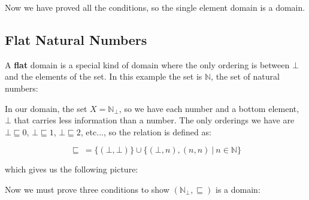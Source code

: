 \vspace{0.25cm}

Now we have proved all the conditions, so the single element domain is a domain.


\subsection{Flat Natural Numbers} A \textbf{flat} domain is a special kind of domain where the only ordering is between $\bot$ and the elements of the set. In this example the set is  $\mathbb{N}$, the set of natural numbers:

In our domain, the set $X = \mathbb{N}_\bot$, so we have each number and a bottom element, $\bot$ that carries less information than a number. The only orderings we have are $\bot \sqsubseteq 0$, $\bot \sqsubseteq 1$, $\bot \sqsubseteq 2$, etc..., so the relation is defined as:

\[ \sqsubseteq  \ = \{ (\bot , \bot) \} \cup \{ (\bot , n) , (n ,n) \ | \ n \in \mathbb{N} \} \] 

which gives us the following picture:   

\vspace{0.5cm}

\begin{center}
\end{center}

\vspace{0.5cm}

Now we must prove three conditions to show $(\mathbb{N}_\bot, \sqsubseteq)$ is a domain: 

